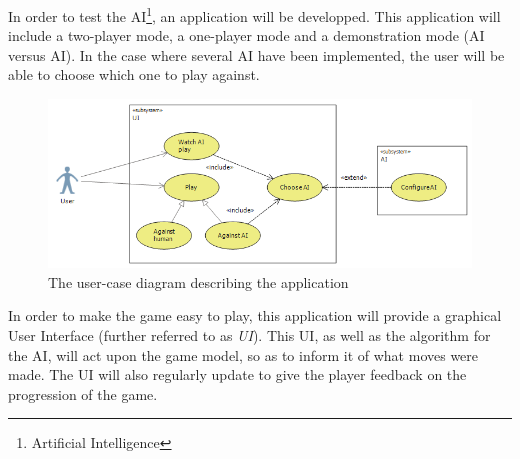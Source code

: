 In order to test the AI\footnote{Artificial Intelligence}, an application will be developped.
This application will include a two-player mode, a one-player mode and a demonstration mode (AI versus AI).
In the case where several AI have been implemented, the user will be able to choose which one to play against.

\begin{figure}[!h]
\centering
\includegraphics[width=\textwidth]{2General_Architecture/2.1Behaviour_of_the_Game/Pictures/Application_UCD}
\caption{The user-case diagram describing the application}
\label{fig:UCD_Play}
\end{figure}

In order to make the game easy to play, this application will provide a graphical User Interface (further referred to as \emph{UI}). %
This UI, as well as the algorithm for the AI, will act upon the game model, so as to inform it of what moves were made.
The UI will also regularly update to give the player feedback on the progression of the game.

